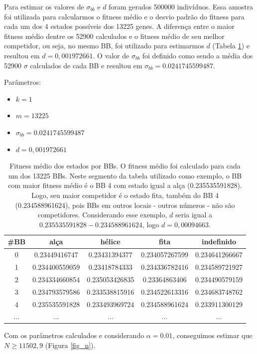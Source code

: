 \documentclass[]{scrreprt}
\begin{document}
Para estimar os valores de $\sigma_{bb}$ e $d$ foram gerados 500000 indivíduos. Essa amostra foi utilizada para calcularmos o fitness médio e o desvio padrão do fitness para cada um dos 4 estados possíveis dos 13225 genes. A diferença entre o maior fitness médio dentre os 52900 calculados e o fitness médio de seu melhor competidor, ou seja, no mesmo BB, foi utilizado para estimarmos $d$ (Tabela \ref{tab_fit}) e resultou em $d=0,001972661$. O valor de $\sigma_{bb}$ foi definido como sendo a média dos 52900 $\sigma$ calculados de cada BB e resultou em $\sigma_{bb}=0.0241745599487$.

Parâmetros:
\begin{itemize}
	\item $k=1$
	\item $m=13225$
	\item $\sigma_{bb}=0.0241745599487$
	\item $d=0,001972661$
\end{itemize}

\begin{table}[h]
	\begin{tabular}{c c c c c}
		\#BB & alça & hélice & fita & indefinido \\ \hline
		0 &	0.23449416747 & 0.23431394377 & 0.234057267599 & 0.234641266667 \\ 
		1 &	0.234400559059 & 0.23418784333 & 0.234336782416 & 	0.234589721927 \\
		2 &	0.234334660854 & 0.235053426835	 & 0.23364863406 &	0.234490579159 \\
		3 &	0.234793579586 &	0.233538815916 &	0.234522613316 &	0.234683748762 \\
		4 &	0.235535591828 &	0.233493969724 &	0.234588961624 &	0.233911300129 \\
		... & ... &... &... &...\\
	\end{tabular}   
	\caption{Fitness médio dos estados por BBs. O fitness médio foi calculado para cada um dos 13225 BBs. Neste segmento da tabela utilizado como exemplo, o BB com maior fitness médio é o BB 4 com estado igual a alça (0.235535591828). Logo, seu maior competidor é o estado fita, também do BB 4 (0.234588961624), pois BBs em outros locais - outros números - não são competidores. Considerando esse exemplo, $d$ seria igual a $0.235535591828-0.234588961624$, logo $d=0,00094663$.}
	\label{tab_fit}
\end{table}
 
 Com os parâmetros calculados e considerando $\alpha=0.01$, conseguimos estimar que $N\ge11502,9$ (Figura \ref{fig_n}).
\end{document}
